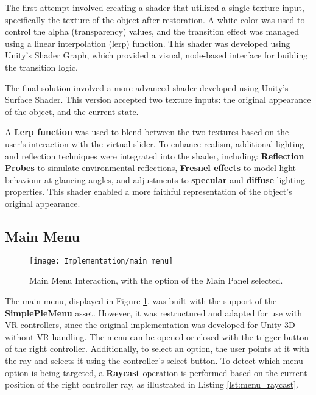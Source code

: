 The first attempt involved creating a shader that utilized a single texture input, specifically the texture of the object after restoration. A white color was used to control the alpha (transparency) values, and the transition effect was managed using a linear interpolation (lerp) function. This shader was developed using Unity’s Shader Graph, which provided a visual, node-based interface for building the transition logic.

The final solution involved a more advanced shader developed using Unity’s Surface Shader. This version accepted two texture inputs:
the original appearance of the object, and the current state.

A \textbf{Lerp function} was used to blend between the two textures based on the user's interaction with the virtual slider. To enhance realism, additional lighting and reflection techniques were integrated into the shader, including:
\textbf{Reflection Probes} to simulate environmental reflections, \textbf{Fresnel effects} to model light behaviour at glancing angles, and adjustments to \textbf{specular} and  \textbf{diffuse} lighting properties. This shader enabled a more faithful representation of the object's original appearance.

\subsection*{Main Menu}
\label{sec:main_menu}

 \begin{figure}[h!]
    \centering
    \texttt{[image: Implementation/main\_menu]}
    \caption{Main Menu Interaction, with the option of the Main Panel selected.}
    \label{fig:main_menu}
\end{figure}

The main menu, displayed in Figure \ref{fig:main_menu}, was built with the support of the \textbf{SimplePieMenu} asset.
However, it was restructured and adapted for use with \gls{VR} controllers, since the original implementation was developed for Unity \gls{3D} without \gls{VR} handling.
The menu can be opened or closed with the trigger button of the right controller.
Additionally, to select an option, the user points at it with the ray and selects it using the controller’s select button. To detect which menu option is being targeted, a \textbf{Raycast} operation is performed based on the current position of the right controller ray, as illustrated in Listing \ref{lst:menu_raycast}.

